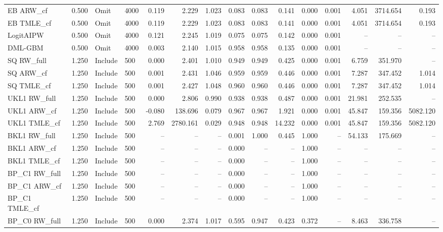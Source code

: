 \begin{tabular}{llllrrrrrrrrrrr}
EB ARW\_cf & 0.500 & Omit & 4000 & 0.119 & 2.229 & 1.023 & 0.083 & 0.083 & 0.141 & 0.000 & 0.001 & 4.051 & 3714.654 & 0.193 \\
EB TMLE\_cf & 0.500 & Omit & 4000 & 0.119 & 2.229 & 1.023 & 0.083 & 0.083 & 0.141 & 0.000 & 0.001 & 4.051 & 3714.654 & 0.193 \\
LogitAIPW & 0.500 & Omit & 4000 & 0.121 & 2.245 & 1.019 & 0.075 & 0.075 & 0.142 & 0.000 & 0.001 & -- & -- & -- \\
DML-GBM & 0.500 & Omit & 4000 & 0.003 & 2.140 & 1.015 & 0.958 & 0.958 & 0.135 & 0.000 & 0.001 & -- & -- & -- \\
SQ RW\_full & 1.250 & Include & 500 & 0.000 & 2.401 & 1.010 & 0.949 & 0.949 & 0.425 & 0.000 & 0.001 & 6.759 & 351.970 & -- \\
SQ ARW\_cf & 1.250 & Include & 500 & 0.001 & 2.431 & 1.046 & 0.959 & 0.959 & 0.446 & 0.000 & 0.001 & 7.287 & 347.452 & 1.014 \\
SQ TMLE\_cf & 1.250 & Include & 500 & 0.001 & 2.427 & 1.048 & 0.960 & 0.960 & 0.446 & 0.000 & 0.001 & 7.287 & 347.452 & 1.014 \\
UKL1 RW\_full & 1.250 & Include & 500 & 0.000 & 2.806 & 0.990 & 0.938 & 0.938 & 0.487 & 0.000 & 0.001 & 21.981 & 252.535 & -- \\
UKL1 ARW\_cf & 1.250 & Include & 500 & -0.080 & 138.696 & 0.079 & 0.967 & 0.967 & 1.921 & 0.000 & 0.001 & 45.847 & 159.356 & 5082.120 \\
UKL1 TMLE\_cf & 1.250 & Include & 500 & 2.769 & 2780.161 & 0.029 & 0.948 & 0.948 & 14.232 & 0.000 & 0.001 & 45.847 & 159.356 & 5082.120 \\
BKL1 RW\_full & 1.250 & Include & 500 & -- & -- & -- & 0.001 & 1.000 & 0.445 & 1.000 & -- & 54.133 & 175.669 & -- \\
BKL1 ARW\_cf & 1.250 & Include & 500 & -- & -- & -- & 0.000 & -- & -- & 1.000 & -- & -- & -- & -- \\
BKL1 TMLE\_cf & 1.250 & Include & 500 & -- & -- & -- & 0.000 & -- & -- & 1.000 & -- & -- & -- & -- \\
BP\_C1 RW\_full & 1.250 & Include & 500 & -- & -- & -- & 0.000 & -- & -- & 1.000 & -- & -- & -- & -- \\
BP\_C1 ARW\_cf & 1.250 & Include & 500 & -- & -- & -- & 0.000 & -- & -- & 1.000 & -- & -- & -- & -- \\
BP\_C1 TMLE\_cf & 1.250 & Include & 500 & -- & -- & -- & 0.000 & -- & -- & 1.000 & -- & -- & -- & -- \\
BP\_C0 RW\_full & 1.250 & Include & 500 & 0.000 & 2.374 & 1.017 & 0.595 & 0.947 & 0.423 & 0.372 & -- & 8.463 & 336.758 & -- \\

\end{tabular}
